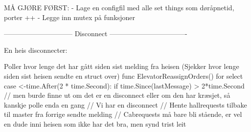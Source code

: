 MÅ GJØRE FØRST:
- Lage en configfil med alle set things som døråpnetid, porter ++
- Legge inn mutex på funksjoner

------------------------------ Disconnect ----------------------------------

En heis disconnecter:

Poller hvor lenge det har gått siden sist melding fra heisen (Sjekker hvor lenge siden sist heisen sendte en struct over)
func ElevatorReassignOrders() {
    for {
        select {
        case <-time.After(2 * time.Second):
            if time.Since(lastMessage) > 2*time.Second { // men burde finne ut om det er en disconnect eller om den har kræsjet, så kanskje polle enda en gang
                // Vi har en disconnect
                // Hente hallrequests tilbake til master fra forrige sendte melding
                // Cabrequests må bare bli stående, er vel en dude inni heisen som ikke har det bra, men synd trist leit
            }
        }
    }
}


